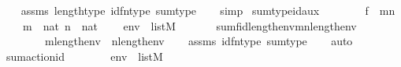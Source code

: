 \begin{isabellebody}
%
\isadelimproof
\ \ %
\endisadelimproof
%
\isatagproof
{}\isamarkupfalse%
\ assms\ length{\isacharunderscore}{\kern0pt}type\ id{\isacharunderscore}{\kern0pt}fn{\isacharunderscore}{\kern0pt}type\ sum{\isacharunderscore}{\kern0pt}type\isanewline
\ \ \isamarkupfalse%
\ simp%
\endisatagproof
{\isafoldproof}%
%
\isadelimproof
\isanewline
%
\endisadelimproof
\isanewline
{}\isamarkupfalse%
\ sum{\isacharunderscore}{\kern0pt}type{\isacharunderscore}{\kern0pt}id{\isacharunderscore}{\kern0pt}aux{}\ {\isacharcolon}{\kern0pt}\isanewline
\ \ \isanewline
\ \ \ \ {\isachardoublequoteopen}f\ {\isasymin}\ m{\isasymrightarrow}n{\isachardoublequoteclose}\isanewline
\ \ \ \ {\isachardoublequoteopen}m\ {\isasymin}\ nat{\isachardoublequoteclose}\ {\isachardoublequoteopen}n\ {\isasymin}\ nat{\isachardoublequoteclose}\isanewline
\ \ \ \ {\isachardoublequoteopen}env{}\ {\isasymin}\ list{\isacharparenleft}{\kern0pt}M{\isacharparenright}{\kern0pt}{\isachardoublequoteclose}\isanewline
\ \ \isanewline
\ \ \ \ {\isachardoublequoteopen}sum{\isacharparenleft}{\kern0pt}f{\isacharcomma}{\kern0pt}id{\isacharparenleft}{\kern0pt}length{\isacharparenleft}{\kern0pt}env{}{\isacharparenright}{\kern0pt}{\isacharparenright}{\kern0pt}{\isacharcomma}{\kern0pt}m{\isacharcomma}{\kern0pt}n{\isacharcomma}{\kern0pt}length{\isacharparenleft}{\kern0pt}env{}{\isacharparenright}{\kern0pt}{\isacharparenright}{\kern0pt}\ {\isasymin}\isanewline
\ \ \ \ \ \ \ \ {\isacharparenleft}{\kern0pt}m{\isacharhash}{\kern0pt}{\isacharplus}{\kern0pt}length{\isacharparenleft}{\kern0pt}env{}{\isacharparenright}{\kern0pt}{\isacharparenright}{\kern0pt}\ {\isasymrightarrow}\ {\isacharparenleft}{\kern0pt}n{\isacharhash}{\kern0pt}{\isacharplus}{\kern0pt}length{\isacharparenleft}{\kern0pt}env{}{\isacharparenright}{\kern0pt}{\isacharparenright}{\kern0pt}{\isachardoublequoteclose}\isanewline
%
\isadelimproof
\ \ %
\endisadelimproof
%
\isatagproof
{}\isamarkupfalse%
\ assms\ id{\isacharunderscore}{\kern0pt}fn{\isacharunderscore}{\kern0pt}type\ sum{\isacharunderscore}{\kern0pt}type\isanewline
\ \ \isamarkupfalse%
\ auto%
\endisatagproof
{\isafoldproof}%
%
\isadelimproof
\isanewline
%
\endisadelimproof
\isanewline
{}\isamarkupfalse%
\ sum{\isacharunderscore}{\kern0pt}action{\isacharunderscore}{\kern0pt}id\ {\isacharcolon}{\kern0pt}\isanewline
\ \ \isanewline
\ \ \ \ {\isachardoublequoteopen}env\ {\isasymin}\ list{\isacharparenleft}{\kern0pt}M{\isacharparenright}{\kern0pt}{\isachardoublequoteclose}\isanewline

\end{isabellebody}

